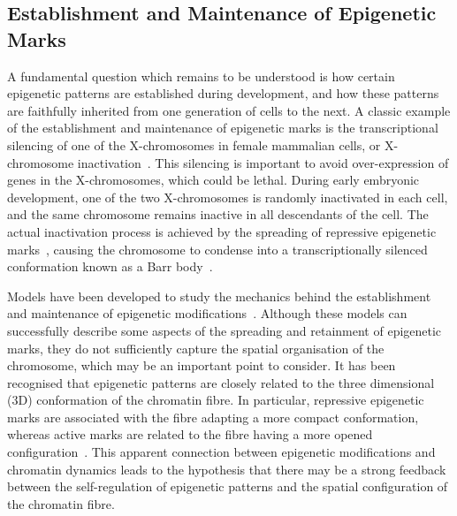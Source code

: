 \documentclass[12pt]{article}
\begin{document}
\subsection{Establishment and Maintenance of Epigenetic Marks}
\label{sec:establishment}
A fundamental question which remains to be understood is how certain epigenetic patterns are established during development, and how these patterns are faithfully inherited from one generation of cells to the next. A classic example of the establishment and maintenance of epigenetic marks is the transcriptional silencing of one of the X-chromosomes in female mammalian cells, or X-chromosome inactivation~\cite{avner2001}. This silencing is important to avoid over-expression of genes in the X-chromosomes, which could be lethal. During early embryonic development, one of the two X-chromosomes is randomly inactivated in each cell, and the same chromosome remains inactive in all descendants of the cell. The actual inactivation process is achieved by the spreading of repressive epigenetic marks~\cite{heard2001, nicodemi2007}, causing the chromosome to condense into a transcriptionally silenced conformation known as a Barr body~\cite{avner2001}. 

Models have been developed to study the mechanics behind the establishment and maintenance of epigenetic modifications~\cite{dodd2007, sneppen2008, hathaway2012, zhang2014, jost2014}. Although these models can successfully describe some aspects of the spreading and retainment of epigenetic marks, they do not sufficiently capture the spatial organisation of the chromosome, which may be an important point to consider. It has been recognised that epigenetic patterns are closely related to the three dimensional (3D) conformation of the chromatin fibre. In particular, repressive epigenetic marks are associated with the fibre adapting a more compact conformation, whereas active marks are related to the fibre having a more opened configuration~\cite{cortini2016, shahbazian2007, hathaway2012}. This apparent connection between epigenetic modifications and chromatin dynamics leads to the hypothesis that there may be a strong feedback between the self-regulation of epigenetic patterns and the spatial configuration of the chromatin fibre.%
\end{document}
